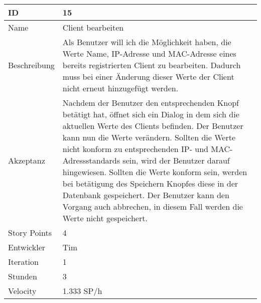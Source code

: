 \begin{table}[htbp]
    \begin{minipage}{\linewidth}
        \setlength{\tymax}{0.5\linewidth}
        \centering
        \small
        \begin{tabulary}{\textwidth}{|l|p{10cm}|} \hline
            ID   &15\\\hline
            Name  &Client bearbeiten\\\hline
            Beschreibung&Als Benutzer will ich die Möglichkeit haben, die Werte Name, IP-Adresse und MAC-Adresse eines bereits registrierten Client zu bearbeiten. Dadurch muss bei einer Änderung dieser Werte der Client nicht erneut hinzugefügt werden.\\\hline
            Akzeptanz &Nachdem der Benutzer den entsprechenden Knopf betätigt hat, öffnet sich ein Dialog in dem sich die aktuellen Werte des Clients befinden. Der Benutzer kann nun die Werte verändern. Sollten die Werte nicht konform zu entsprechenden IP- und MAC- Adressstandards sein, wird der Benutzer darauf hingewiesen. Sollten die Werte konform sein, werden bei betätigung des Speichern Knopfes diese in der Datenbank gespeichert. Der Benutzer kann den Vorgang auch abbrechen, in diesem Fall werden die Werte nicht gespeichert. \\\hline
            Story Points&4\\\hline
            Entwickler &Tim\\\hline
            Iteration &1\\\hline
            Stunden  &3\\\hline
            Velocity &1.333 SP\slash h\\\hline
        \end{tabulary}
    \end{minipage}
\end{table}



